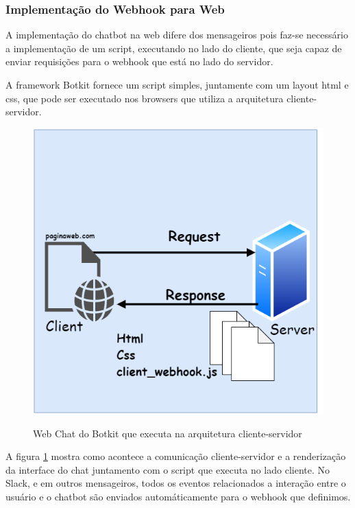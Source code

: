 \subsubsection{Implementação do Webhook para Web}

A implementação do chatbot na web difere dos mensageiros pois faz-se necessário a implementação de um script, executando no lado do cliente, que seja capaz de enviar requisições para o webhook que está no lado do servidor.

A framework Botkit fornece um script simples, juntamente com um layout html e css, que pode ser executado nos browsers que utiliza a arquitetura cliente-servidor. 

\begin{figure}[H]
  \centering
   \caption{Web Chat do Botkit que executa na arquitetura cliente-servidor  }
  \includegraphics[scale=0.4]{Imagens/http-client.png} 
  \label{fig:http_webhook}
\end{figure}

A figura \ref{fig:http_webhook} mostra como acontece a comunicação cliente-servidor e a renderização da interface do chat juntamento com o script que executa no lado cliente. No Slack, e em outros mensageiros, todos os eventos relacionados a interação entre o usuário e o chatbot são enviados automáticamente para o webhook que definimos.

